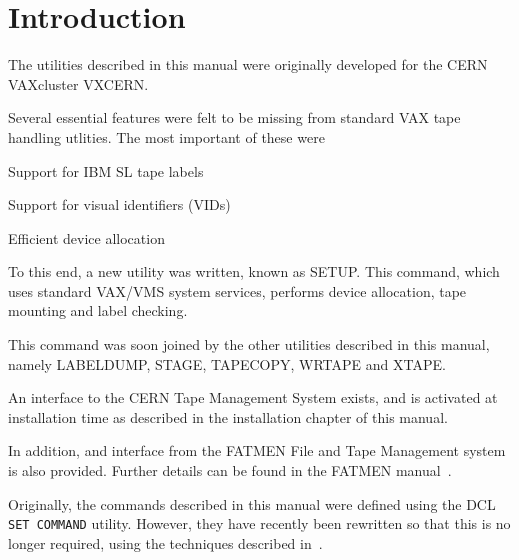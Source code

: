 \chapter{Introduction}
\par
The utilities described in this manual were originally developed
for the CERN VAXcluster VXCERN.

Several essential features were felt to be missing from standard
VAX tape handling utlities. The most important of these were

\begin{UL}
\item
Support for IBM SL tape labels
\item
Support for visual identifiers (VIDs)
\item
Efficient device allocation
\end{UL}

To this end, a new utility was written, known as SETUP. This
command, which uses standard VAX/VMS system services, performs
device allocation, tape mounting and label checking.

This command was soon joined by the other utilities described in
this manual, namely LABELDUMP, STAGE, TAPECOPY, WRTAPE and XTAPE.

An interface to the CERN Tape Management System exists, and is
activated at installation time as described in the installation
chapter of this manual.

In addition, and interface from the FATMEN File and Tape Management
system is also provided. Further details can be found in the FATMEN
manual~\cite{bib-FATMEN}.

Originally, the commands described in this manual were defined
using the DCL {\tt SET COMMAND} utility. However, they have
recently been rewritten so that this is no longer required,
using the techniques described in~\cite{bib-NOCLD}.

